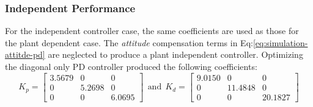 \subsubsection{Independent Performance}
\label{subsubsec:simulation.atttiude.pd.independent}
For the independent controller case, the same coefficients are used as those for the plant dependent case. The \emph{attitude} compensation terms in Eq:\ref{eq:simulation-attitde-pd} are neglected to produce a plant independent controller. Optimizing the diagonal only PD controller produced the following coefficients:
\begin{equation}\label{eq:optimized-pd-independent}
K_p = \begin{bmatrix}
3.5679 & 0 & 0\\
0 & 5.2698 & 0\\
0 & 0 & 6.0695
\end{bmatrix}
~~\text{and}~~K_d = \begin{bmatrix}
9.0150 & 0 & 0\\
0 & 11.4848 & 0\\
0 & 0 & 20.1827
\end{bmatrix}
\end{equation}
\par

